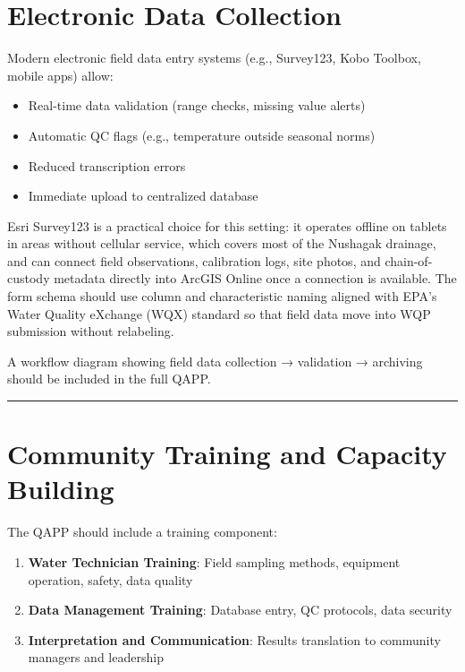\documentclass[
  letterpaper,
]{scrbook}
\providecommand{\tightlist}{%
  \setlength{\itemsep}{0pt}\setlength{\parskip}{0pt}}\usepackage{longtable,booktabs,array}
\begin{document}
\section{Electronic Data Collection}\label{electronic-data-collection}

Modern electronic field data entry systems (e.g., Survey123, Kobo
Toolbox, mobile apps) allow:

\begin{itemize}
\tightlist
\item
  Real-time data validation (range checks, missing value alerts)
\item
  Automatic QC flags (e.g., temperature outside seasonal norms)
\item
  Reduced transcription errors
\item
  Immediate upload to centralized database
\end{itemize}

Esri Survey123 is a practical choice for this setting: it operates
offline on tablets in areas without cellular service, which covers most
of the Nushagak drainage, and can connect field observations,
calibration logs, site photos, and chain-of-custody metadata directly
into ArcGIS Online once a connection is available. The form schema
should use column and characteristic naming aligned with EPA's Water
Quality eXchange (WQX) standard so that field data move into WQP
submission without relabeling.

A workflow diagram showing field data collection → validation →
archiving should be included in the full QAPP.

\begin{center}\rule{0.5\linewidth}{0.5pt}\end{center}

\section{Community Training and Capacity
Building}\label{community-training-and-capacity-building}

The QAPP should include a training component:

\begin{enumerate}
\def\labelenumi{\arabic{enumi}.}
\tightlist
\item
  \textbf{Water Technician Training}: Field sampling methods, equipment
  operation, safety, data quality
\item
  \textbf{Data Management Training}: Database entry, QC protocols, data
  security
\item
  \textbf{Interpretation and Communication}: Results translation to
  community managers and leadership
\end{enumerate}
\end{document}
